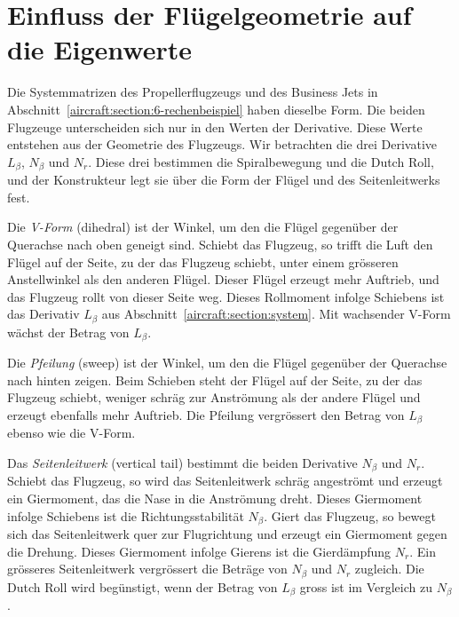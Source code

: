 %
%
%
%
\section{Einfluss der Flügelgeometrie auf die Eigenwerte
\label{aircraft:section:fluegel}}
Die Systemmatrizen des Propellerflugzeugs und des Business Jets in
Abschnitt~\ref{aircraft:section:6-rechenbeispiel} haben dieselbe Form.
Die beiden Flugzeuge unterscheiden sich nur in den Werten der Derivative.
Diese Werte entstehen aus der Geometrie des Flugzeugs.
Wir betrachten die drei Derivative $L_\beta$, $N_\beta$ und $N_r$.
Diese drei bestimmen die Spiralbewegung und die Dutch Roll, und der
Konstrukteur legt sie über die Form der Flügel und des Seitenleitwerks fest.

Die \emph{V-Form} (dihedral) ist der Winkel, um den die Flügel gegenüber der
%
Querachse nach oben geneigt sind.
Schiebt das Flugzeug, so trifft die Luft den Flügel auf der Seite, zu der das
Flugzeug schiebt, unter einem grösseren Anstellwinkel als den anderen Flügel.
Dieser Flügel erzeugt mehr Auftrieb, und das Flugzeug rollt von dieser Seite
weg.
Dieses Rollmoment infolge Schiebens ist das Derivativ $L_\beta$ aus
Abschnitt~\ref{aircraft:section:system}.
Mit wachsender V-Form wächst der Betrag von $L_\beta$.

Die \emph{Pfeilung} (sweep) ist der Winkel, um den die Flügel gegenüber der
%
Querachse nach hinten zeigen.
Beim Schieben steht der Flügel auf der Seite, zu der das Flugzeug schiebt,
weniger schräg zur Anströmung als der andere Flügel und erzeugt ebenfalls mehr
Auftrieb.
Die Pfeilung vergrössert den Betrag von $L_\beta$ ebenso wie die V-Form.

Das \emph{Seitenleitwerk} (vertical tail) bestimmt die beiden
%
Derivative $N_\beta$ und $N_r$.
Schiebt das Flugzeug, so wird das Seitenleitwerk schräg angeströmt und erzeugt
ein Giermoment, das die Nase in die Anströmung dreht.
Dieses Giermoment infolge Schiebens ist die Richtungsstabilität $N_\beta$.
Giert das Flugzeug, so bewegt sich das Seitenleitwerk quer zur Flugrichtung und
erzeugt ein Giermoment gegen die Drehung.
Dieses Giermoment infolge Gierens ist die Gierdämpfung $N_r$.
Ein grösseres Seitenleitwerk vergrössert die Beträge von $N_\beta$ und $N_r$
zugleich.
Die Dutch Roll wird begünstigt, wenn der Betrag von $L_\beta$ gross ist im
Vergleich zu $N_\beta$.

